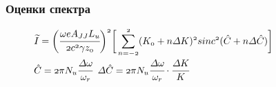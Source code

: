 \documentclass[14pt, hyperref = {colorlinks},xcolor=table ]{beamer}
\begin{document}
\small
\begin{frame}
\frametitle{Оценки спектра}\label{t1}
\vspace{-5pt}
\begin{figure}[h]
\begin{minipage}[h]{0.49\linewidth}
	\vspace{-10pt}
\end{minipage}	
\end{figure}

\vspace{-20pt}
\begin{figure}[h]
$\mathnormal{{\widetilde{I}} =
	\bigg(\cfrac{\omega eA_{JJ}L_u}{2c^2 \gamma z_0}\bigg)^2\bigg[
	\displaystyle\sum\limits_{n =-2}^{2}(K_0 + n\Delta K)^2sinc^2(\hat{C} + n\Delta \hat{C})}\bigg]$\\
\vspace{10pt}
$\mathnormal{\hat{C} = 2\pi N_u\cfrac{\Delta\omega}{\omega_r}}$ \hspace{10pt}$\mathnormal{\Delta \hat{C} = 2\pi N_u\cfrac{\Delta\omega}{\omega_r} \cdot \cfrac{\Delta K}{K}}$
\end{figure}
\end{frame}
\end{document}
